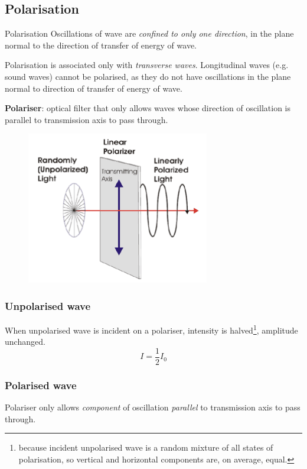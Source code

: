 \subsection{Polarisation}
\begin{defn}{Polarisation}{}
Oscillations of wave are \emph{confined to only one direction}, in the plane normal to the direction of transfer of energy of wave.
\end{defn}

\begin{remark}
Polarisation is associated only with \emph{transverse waves}. Longitudinal waves (e.g. sound waves) cannot be polarised, as they do not have oscillations in the plane normal to direction of transfer of energy of wave.
\end{remark}

\textbf{Polariser}: optical filter that only allows waves whose direction of oscillation is parallel to transmission axis to pass through.

\begin{figure}[H]
    \centering
    \includegraphics[width=8cm]{images/polarisation.png}
\end{figure}

\subsubsection{Unpolarised wave}
When unpolarised wave is incident on a polariser, intensity is halved\footnote{because incident unpolarised wave is a random mixture of all states of polarisation, so vertical and horizontal components are, on average, equal.}, amplitude unchanged.
\begin{equation}
I=\frac{1}{2}I_0
\end{equation}

\subsubsection{Polarised wave}
Polariser only allows \emph{component} of oscillation \emph{parallel} to transmission axis to pass through.

